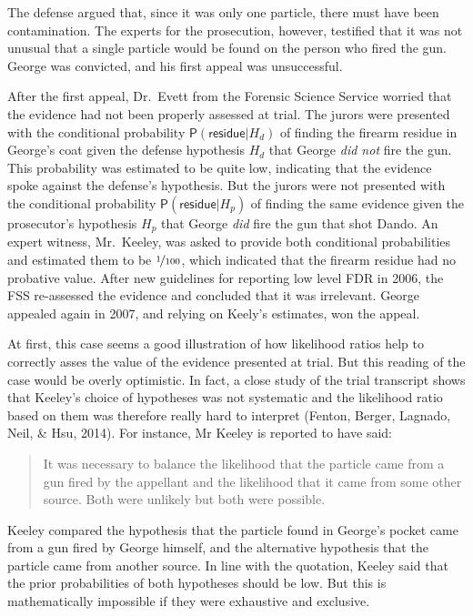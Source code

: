 \documentclass[10pt,dvipsnames,enabledeprecatedfontcommands]{scrartcl}
\newcommand{\pr}[1]{\mathsf{P}(#1)}
\begin{document}
\vspace{2mm} \noindent  The defense argued that, since it was only one
particle, there must have been contamination. The experts for the
prosecution, however, testified that it was not unusual that a single
particle would be found on the person who fired the gun. George was
convicted, and his first appeal was unsuccessful.

After the first appeal, Dr.~Evett from the Forensic Science Service
worried that the evidence had not been properly assessed at trial. The
jurors were presented with the conditional probability
\(\pr{\textsf{residue}\vert H_d}\) of finding the firearm residue in
George's coat given the defense hypothesis \(H_d\) that George
\textit{did not} fire the gun. This probability was estimated to be
quite low, indicating that the evidence spoke against the defense's
hypothesis. But the jurors were not presented with the conditional
probability \(\pr{\textsf{residue}\vert H_p}\) of finding the same
evidence given the prosecutor's hypothesis \(H_p\) that George
\textit{did} fire the gun that shot Dando. An expert witness,
Mr.~Keeley, was asked to provide both conditional probabilities and
estimated them to be \(\nicefrac{1}{100}\), which indicated that the
firearm residue had no probative value. After new guidelines for
reporting low level FDR in 2006, the FSS re-assessed the evidence and
concluded that it was irrelevant. George appealed again in 2007, and
relying on Keely's estimates, won the appeal.

At first, this case seems a good illustration of how likelihood ratios
help to correctly asses the value of the evidence presented at trial.
But this reading of the case would be overly optimistic. In fact, a
close study of the trial transcript shows that Keeley's choice of
hypotheses was not systematic and the likelihood ratio based on them was
therefore really hard to interpret (Fenton, Berger, Lagnado, Neil, \&
Hsu, 2014). For instance, Mr Keeley is reported to have said:

\begin{quote}
    It was necessary to balance the likelihood that the particle came from a gun fired by the appellant and the likelihood that it came from some other source. Both were unlikely but both were possible.
\end{quote}

\noindent  Keeley compared the hypothesis that the particle found in
George's pocket came from a gun fired by George himself, and the
alternative hypothesis that the particle came from another source. In
line with the quotation, Keeley said that the prior probabilities of
both hypotheses should be low. But this is mathematically impossible if
they were exhaustive and exclusive.
\end{document}

